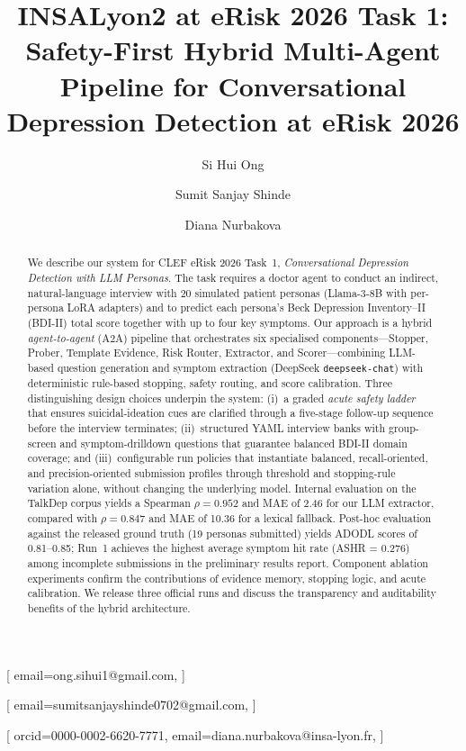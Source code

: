 \documentclass[]{ceurart}
\begin{document}


\title{INSALyon2 at eRisk 2026 Task 1: Safety-First Hybrid Multi-Agent Pipeline for Conversational Depression Detection at eRisk 2026}


\author[1]{Si Hui Ong}[%
  email=ong.sihui1@gmail.com,
]
\author[1]{Sumit Sanjay Shinde}[%
  email=sumitsanjayshinde0702@gmail.com,
]
\author[1]{Diana Nurbakova}[%
  orcid=0000-0002-6620-7771,
  email=diana.nurbakova@insa-lyon.fr,
]
\address[1]{INSA Lyon, CNRS, Universite Claude Bernard Lyon 1, LIRIS, UMR5205,     69100 Villeurbanne, France}

\begin{abstract}
We describe our system for CLEF eRisk 2026 Task~1, \emph{Conversational Depression Detection with LLM Personas}.
The task requires a doctor agent to conduct an indirect, natural-language interview with 20 simulated patient personas (Llama-3-8B with per-persona LoRA adapters) and to predict each persona's Beck Depression Inventory--II (BDI-II) total score together with up to four key symptoms.
Our approach is a hybrid \emph{agent-to-agent} (A2A) pipeline that orchestrates six specialised components---Stopper, Prober, Template Evidence, Risk Router, Extractor, and Scorer---combining LLM-based question generation and symptom extraction (DeepSeek \texttt{deepseek-chat}) with deterministic rule-based stopping, safety routing, and score calibration.
Three distinguishing design choices underpin the system: (i)~a graded \emph{acute safety ladder} that ensures suicidal-ideation cues are clarified through a five-stage follow-up sequence before the interview terminates; (ii)~structured YAML interview banks with group-screen and symptom-drilldown questions that guarantee balanced BDI-II domain coverage; and (iii)~configurable run policies that instantiate balanced, recall-oriented, and precision-oriented submission profiles through threshold and stopping-rule variation alone, without changing the underlying model.
Internal evaluation on the TalkDep corpus yields a Spearman $\rho = 0.952$ and MAE of 2.46 for our LLM extractor, compared with $\rho = 0.847$ and MAE of 10.36 for a lexical fallback.
Post-hoc evaluation against the released ground truth (19 personas submitted) yields ADODL scores of 0.81--0.85; Run~1 achieves the highest average symptom hit rate (ASHR = 0.276) among incomplete submissions in the preliminary results report.
Component ablation experiments confirm the contributions of evidence memory, stopping logic, and acute calibration.
We release three official runs and discuss the transparency and auditability benefits of the hybrid architecture.
\end{abstract}
\end{document}
